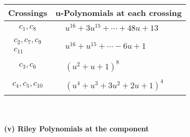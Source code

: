 \documentclass[1p]{elsarticle_modified}
\theoremstyle{definition}
\begin{document}
\begin{tabular}{m{50pt}|m{274pt}}
Crossings & \hspace{64pt}u-Polynomials at each crossing \\
\hline $$\begin{aligned}c_{1},c_{8}\end{aligned}$$&$\begin{aligned}
&u^{16}+3 u^{15}+\cdots+48 u+13
\end{aligned}$\\
\hline $$\begin{aligned}c_{2},c_{7},c_{9}\\c_{11}\end{aligned}$$&$\begin{aligned}
&u^{16}+u^{15}+\cdots-6 u+1
\end{aligned}$\\
\hline $$\begin{aligned}c_{3},c_{6}\end{aligned}$$&$\begin{aligned}
&(u^2+u+1)^8
\end{aligned}$\\
\hline $$\begin{aligned}c_{4},c_{5},c_{10}\end{aligned}$$&$\begin{aligned}
&(u^4+u^3+3 u^2+2 u+1)^4
\end{aligned}$\\
\hline
\end{tabular}\\~\\
\newpage\renewcommand{\arraystretch}{1}
\flushleft \textbf{(v) Riley Polynomials at the component}\newline \\
\end{document}
